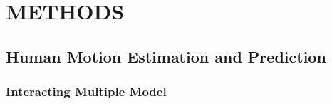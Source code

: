 \documentclass[letterpaper, 10 pt, conference]{ieeeconf}
\begin{document}
	\section{METHODS} \label{sec:framework}
	
	\subsection{Human Motion Estimation and Prediction}\label{subsec:human_track}
	\subsubsection{Interacting Multiple Model}\label{subsec:imm}
	
\end{document}

